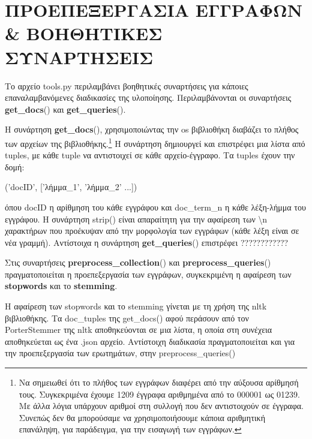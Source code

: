 \documentclass[12pt]{report}
\begin{document}
        \section{ΠΡΟΕΠΕΞΕΡΓΑΣΙΑ ΕΓΓΡΑΦΩΝ \& ΒΟΗΘΗΤΙΚΕΣ ΣΥΝΑΡΤΗΣΕΙΣ}

            Το αρχείο {\fontCode\small tools.py} περιλαμβάνει βοηθητικές συναρτήσεις για κάποιες επαναλαμβανόμενες διαδικασίες της υλοποίησης.
            Περιλαμβάνονται οι συναρτήσεις {\fontCode\small \textbf{get\_docs}()} και {\fontCode\small \textbf{get\_queries}()}.

            Η συνάρτηση {\fontCode\small \textbf{get\_docs}()}, χρησιμοποιώντας την {\fontCode\small os} βιβλιοθήκη
            διαβάζει το πλήθος των αρχείων της βιβλιοθήκης.\footnote{Να σημειωθεί ότι το πλήθος των εγγράφων διαφέρει από την αύξουσα αρίθμησή τους. Συγκεκριμένα έχουμε 1209 έγγραφα αριθμημένα από το {\fontCode\scriptsize 000001} ως {\fontCode\scriptsize 01239}. Με άλλα λόγια υπάρχουν αριθμοί στη συλλογή που δεν αντιστοιχούν σε έγγραφα. Συνεπώς δεν θα μπορούσαμε να χρησιμοποιήσουμε κάποια αριθμητική επανάληψη, για παράδειγμα, για την εισαγωγή των εγγράφων.}
            Η συνάρτηση δημιουργεί και επιστρέφει μια λίστα από tuples, με κάθε tuple να αντιστοιχεί σε κάθε αρχείο-έγγραφο. Τα tuples έχουν την δομή:

                \begin{graycomment} \centering
                {\fontCode\footnotesize ('docID', ['λήμμα\_1', 'λήμμα\_2' ...])}
                \end{graycomment}

            \noindent όπου {\fontCode\small docID} η αρίθμηση του κάθε εγγράφου και {\fontCode\small doc\_term\_n} η κάθε λέξη-λήμμα του εγγράφου.
            Η συνάρτηση {\fontCode\small strip()} είναι απαραίτητη για την αφαίρεση των {\fontCode\small \textbackslash n} χαρακτήρων που προέκυψαν από την μορφολογία των εγγράφων (κάθε λέξη είναι σε νέα γραμμή).
            Αντίστοιχα η συνάρτηση {\fontCode\small \textbf{get\_queries}()} επιστρέφει ????????????

            Στις συναρτήσεις {\fontCode\small \textbf{preprocess\_collection}()} και {\fontCode\small \textbf{preprocess\_queries}()} πραγματοποιείται η προεπεξεργασία των εγγράφων, συγκεκριμένη η αφαίρεση των \textbf{stopwords} και το \textbf{stemming}.


            Η αφαίρεση των stopwords και το stemming γίνεται με τη χρήση της {\fontCode\small nltk} βιβλιοθήκης. Τα {\fontCode\small doc\_tuples} της {\fontCode\small get\_docs()} αφού περάσουν από τον {\fontCode\small PorterStemmer} της {\fontCode\small nltk} αποθηκεύονται σε μια λίστα, η οποία στη συνέχεια αποθηκεύεται ως ένα {\fontCode\small .json} αρχείο.
            Αντίστοιχη διαδικασία πραγματοποιείται και για την προεπεξεργασία των ερωτημάτων, στην {\fontCode\small preprocess\_queries()}
\end{document}
